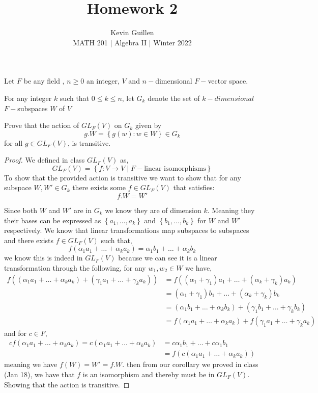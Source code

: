\documentclass[11pt]{article}
\newenvironment{problem}[2][Problem\!]{\begin{trivlist}
\item[\hskip \labelsep {\bfseries #1}\hskip \labelsep {\bfseries #2}]}{\end{trivlist}}
\newcommand{\set}[1]{\left\{#1\right\}} %
\renewcommand{\geq}{\geqslant}
\renewcommand{\leq}{\leqslant}
\begin{document}
 
\title{Homework 2}
\author{Kevin Guillen\\[0.5em]
MATH 201  | Algebra II | Winter 2022}
\date{} 
\maketitle


\begin{tcolorbox}
  \begin{problem} {P1}
    Let $F$ be any field , $n \geq 0 $ an integer, $V$ and $n-$dimensional $F-$vector space.

    For any integer $k$ such that $0 \leq k \leq n$, let $G_k$ denote the set of $k-dimensional$ $F-$subspaces $W$ of $V$

    Prove that the action of $GL_F(V)$ on $G_k$ given by
    \[g.W = \set{g(w): w \in W} \in G_k\]
    for all $g \in GL_F(V)$, is transitive.
  \end{problem}
\end{tcolorbox}

\begin{proof}
  We defined in class $GL_F(V)$ as,
  \[GL_F(V) = \set{f: V \rightarrow V \mid F-\text{linear isomorphisms}}\]
  To show that the provided action is transitive we want to show that for any subspace $W,W' \in G_k$ there exists some $f \in GL_F(V)$ that satisfies:
  \[f.W = W'\]

  Since both $W$ and $W'$ are in $G_k$ we know they are of dimension $k$. Meaning they their bases can be expressed as $\set{a_1, \dots , a_k}$ and $\set{b_1, \dots ,b_k}$ for $W$ and $W'$ respectively. We know that linear transformations map subspaces to subspaces and there exists $f\in GL_F(V)$ such that,
  \[f(\alpha_1a_1 + \dots + \alpha_ka_k) = \alpha_1b_1 + \dots +\alpha_kb_k\]
  we know this is indeed in $GL_F(V)$ because we can see it is a linear transformation through the following, for any $w_1,w_2 \in W $ we have,
 \begin{align*}
  f((\alpha_1a_1 + \dots + \alpha_ka_k) + (\gamma_1a_1 + \dots + \gamma_ka_k )) &= f((\alpha_1 + \gamma_1)a_1 + \dots + (\alpha_k + \gamma_k)a_k) \\
  &= (\alpha_1 + \gamma_1)b_1 + \dots + (\alpha_k + \gamma_k)b_k \\
  &=(\alpha_1b_1 + \dots + \alpha_kb_k) + (\gamma_1b_1 + \dots + \gamma_kb_k ) \\
  &= f(\alpha_1a_1 + \dots + \alpha_ka_k) + f(\gamma_1a_1 + \dots + \gamma_ka_k)
 \end{align*}
 and for $c \in F$,
 \begin{align*}
   cf(\alpha_1a_1 + \dots + \alpha_ka_k) = c(\alpha_1a_1 + \dots + \alpha_ka_k) &= c\alpha_1b_1 + \dots + c\alpha_1b_1 \\
   &= f(c(\alpha_1a_1 + \dots + \alpha_ka_k))
 \end{align*}
 meaning we have $f(W) = W' = f.W$.
 then from our corollary we proved in class (Jan 18), we have that $f$ is an isomorphism and thereby must be in $GL_F(V)$. Showing that the action is transitive.
\end{proof}
\end{document}
